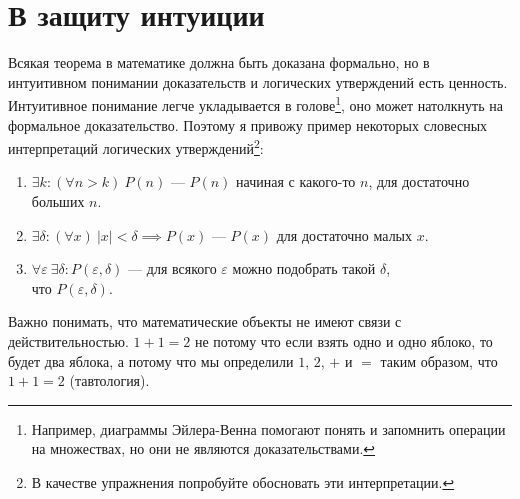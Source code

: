 \part{В защиту интуиции}

Всякая теорема в математике должна быть доказана формально,
но в интуитивном понимании доказательств и логических утверждений есть ценность.
Интуитивное понимание легче укладывается в голове\footnote{Например, диаграммы
	Эйлера-Венна помогают понять и запомнить операции на множествах, но они
	не являются доказательствами.},
оно может натолкнуть на формальное доказательство. Поэтому я привожу пример
некоторых словесных интерпретаций логических утверждений\footnote{В качестве
	упражнения попробуйте обосновать эти интерпретации.}:
\begin{enumerate}
	\item{}$\exists k:(\forall n>k)~P(n)$ --- $P(n)$ начиная с какого-то $n$,
	для достаточно больших $n$.
	\item{}$\exists \delta:(\forall x)~|x|<\delta\implies P(x)$ --- $P(x)$ для
	достаточно малых $x$.
	\item{}$\forall \varepsilon~\exists \delta:P(\varepsilon,\delta)$ ---
	для всякого $\varepsilon$ можно подобрать такой $\delta$,\\что $P(\varepsilon,\delta)$.
\end{enumerate}

Важно понимать, что математические объекты не имеют связи с действительностью.
$1+1=2$ не потому что если взять одно и одно яблоко, то будет два яблока, а
потому что мы определили $1$, $2$, $+$ и $=$ таким образом, что $1+1=2$ (тавтология).
